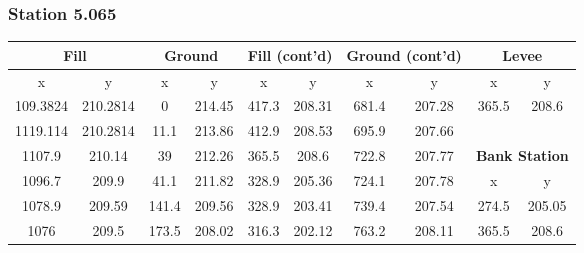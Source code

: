 
\subsubsection{Station 5.065}
\begin{center}

\begin{tabular}{|cccc||cccc||cc|} 
    \hline
    \multicolumn{2}{|c}{\textbf{Fill }} & \multicolumn{2}{c||}{\textbf{Ground }} & \multicolumn{2}{c}{\textbf{Fill (cont'd) }} & \multicolumn{2}{c||}{\textbf{Ground (cont'd) }} & \multicolumn{2}{c|}{\textbf{Levee }}           \\ 
    \hline
    x        & y                        & x     & y                             & x     & y                                   & x      & y                                     & x        & y                                   \\
    109.3824 & 210.2814                 & 0     & 214.45                        & 417.3 & 208.31                              & 681.4  & 207.28                                & 365.5    & 208.6                               \\
    1119.114 & 210.2814                 & 11.1  & 213.86                        & 412.9 & 208.53                              & 695.9  & 207.66                                &          &                                     \\
    1107.9   & 210.14                   & 39    & 212.26                        & 365.5 & 208.6                               & 722.8  & 207.77                                & \multicolumn{2}{c|}{\textbf{Bank Station }}    \\ 
    \cline{9-10}
    1096.7   & 209.9                    & 41.1  & 211.82                        & 328.9 & 205.36                              & 724.1  & 207.78                                & x        & y                                   \\
    1078.9   & 209.59                   & 141.4 & 209.56                        & 328.9 & 203.41                              & 739.4  & 207.54                                & 274.5    & 205.05                              \\
    1076     & 209.5                    & 173.5 & 208.02                        & 316.3 & 202.12                              & 763.2  & 208.11                                & 365.5    & 208.6                               \\

\end{tabular}
\end{center}
